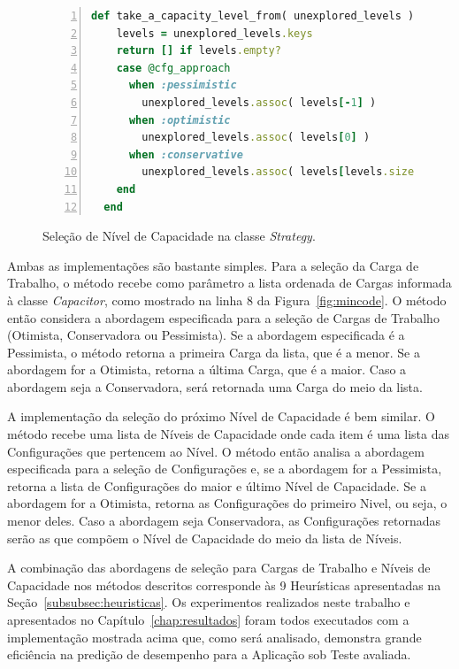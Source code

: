 \begin{figure}[t]
  \begin{lstlisting}[language=Ruby,linewidth=\textwidth,xleftmargin=.04\textwidth, numbers=left]
  def take_a_capacity_level_from( unexplored_levels )
    levels = unexplored_levels.keys
    return [] if levels.empty?
    case @cfg_approach
      when :pessimistic
        unexplored_levels.assoc( levels[-1] )
      when :optimistic
        unexplored_levels.assoc( levels[0] )
      when :conservative
        unexplored_levels.assoc( levels[levels.size / 2] )
    end
  end
  \end{lstlisting}
  \caption{\label{fig:strategy_capacity_code}Seleção de Nível de Capacidade na classe \emph{Strategy}.}
\end{figure}

Ambas as implementações são bastante simples. Para a seleção da Carga de Trabalho,
o método recebe como parâmetro a lista ordenada de Cargas informada à classe 
\emph{Capacitor}, como mostrado na linha 8 da Figura~\ref{fig:mincode}. O método 
então considera a abordagem especificada para a seleção de Cargas de Trabalho 
(Otimista, Conservadora ou Pessimista). Se a abordagem especificada é a Pessimista, 
o método retorna a primeira Carga da lista, que é a menor. Se a abordagem for a
Otimista, retorna a última Carga, que é a maior. Caso a abordagem seja a Conservadora,
será retornada uma Carga do meio da lista.

A implementação da seleção do próximo Nível de Capacidade é bem similar. O método
recebe uma lista de Níveis de Capacidade onde cada item é uma lista das Configurações
que pertencem ao Nível. O método então analisa a abordagem especificada para a
seleção de Configurações e, se a abordagem for a Pessimista, retorna a lista de 
Configurações do maior e último Nível de Capacidade. Se a abordagem for a Otimista, 
retorna as Configurações do primeiro Nivel, ou seja, o menor deles. Caso a abordagem
seja Conservadora, as Configurações retornadas serão as que compõem o Nível de 
Capacidade do meio da lista de Níveis.    

A combinação das abordagens de seleção para Cargas de Trabalho e Níveis de 
Capacidade nos métodos descritos corresponde às 9 Heurísticas apresentadas na
Seção~\ref{subsubsec:heuristicas}. Os experimentos realizados neste trabalho e 
apresentados no Capítulo~\ref{chap:resultados} foram todos executados com a 
implementação mostrada acima que, como será analisado, demonstra grande eficiência
na predição de desempenho para a Aplicação sob Teste avaliada.
 

